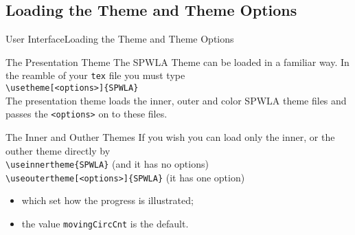 \documentclass[10pt,xcolor={dvipsnames},aspectratio=169]{beamer}
\begin{document}
\subsection{Loading the Theme and Theme Options}
\begin{frame}{User Interface}{Loading the Theme and Theme Options}
  \vspace{-0.5em}
  \begin{block}{The Presentation Theme}
    \small
    The SPWLA Theme can be loaded in a familiar way. In the reamble of your {\tt tex} file you must type\\
    {\tt \textbackslash usetheme[<options>]\{SPWLA\}}\\
    The presentation theme loads the inner, outer and color SPWLA theme files and passes the {\tt <options>} on to these files.
  \end{block}
  \begin{block}{The Inner and Outher Themes}
    \small
    If you wish you can load only the inner, or the outher theme directly by\\
    {\tt \textbackslash useinnertheme\{SPWLA\}} (and it has no options)\\
    {\tt \textbackslash useoutertheme[<options>]\{SPWLA\}} (it has one option)\\
    \begin{itemize}
    \item which set how the progress is illustrated;
    \item the value {\tt movingCircCnt} is the default.
    \end{itemize}
  \end{block}
\end{frame}
\end{document}
